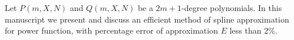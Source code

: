 ﻿Let $P(m, X, N)$ and $Q(m, X, N)$ be a $2m+1$-degree polynomials.
In this manuscript we present and discuss an efficient method of spline approximation
for power function, with percentage error of approximation $E$ less than $2\%$.
